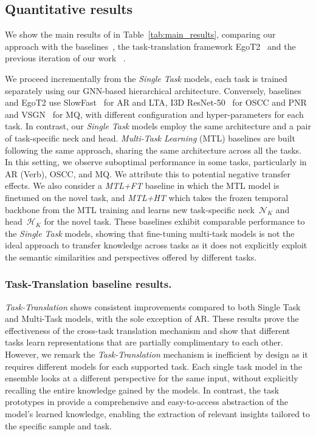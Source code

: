 \subsection{Quantitative results}\label{sec:exp_quantitative}
We show the main results of \ours in Table~\ref{tab:main_results}, comparing our approach with the \egofourd baselines~\cite{ego4d}, the task-translation framework EgoT2~\cite{egot2} and the previous iteration of our work \ourscvpr~\cite{egopack}.

%
We proceed incrementally from the \emph{Single Task} models, \ie each task is trained separately using our GNN-based hierarchical architecture.
%
Conversely, \egofourd baselines and EgoT2 use SlowFast~\cite{slowfast} for AR and LTA, I3D ResNet-50~\cite{carreira2017quo} for OSCC and PNR and VSGN~\cite{zhao2021video} for MQ, with different configuration and hyper-parameters for each task.
In contrast, our \emph{Single Task} models employ the same architecture and a pair of task-specific neck and head.
\emph{Multi-Task Learning} (MTL) baselines are built following the same approach, \ie sharing the same architecture across all the tasks.
In this setting, we observe suboptimal performance in some tasks, particularly in AR (Verb), OSCC, and MQ. We attribute this to potential negative transfer effects.
%
We also consider a \emph{MTL+FT} baseline in which the MTL model is finetuned on the novel task, and  \emph{MTL+HT} which takes the frozen temporal backbone from the MTL training and learns new task-specific neck~$\mathcal{N}_K$ and head~$\mathcal{H}_K$ for the novel task.
These baselines exhibit comparable performance to the \emph{Single Task} models, showing that fine-tuning multi-task models is not the ideal approach to transfer knowledge across tasks as it does not explicitly exploit the semantic similarities and perspectives offered by different tasks.

\subsubsection{Task-Translation baseline results.}
\emph{Task-Translation} shows consistent improvements compared to both Single Task and Multi-Task models, with the sole exception of AR.
These results prove the effectiveness of the cross-task translation mechanism and show that different tasks learn representations that are partially complimentary to each other.
However, we remark the \emph{Task-Translation} mechanism is inefficient by design as it requires different models for each supported task.
Each single task model in the ensemble looks at a different perspective for the same input, without explicitly recalling the entire knowledge gained by the models.
In contrast, the task prototypes in \ours provide a comprehensive and easy-to-access abstraction of the model’s learned knowledge, enabling the extraction of relevant insights tailored to the specific sample and task.



